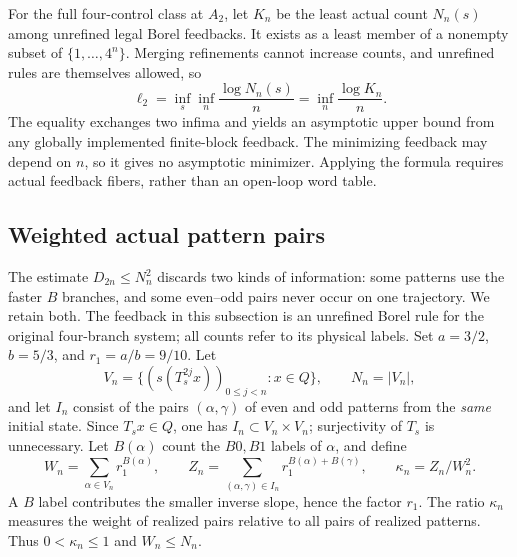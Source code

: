 \documentclass[11pt,reqno]{amsart}
\numberwithin{equation}{section}
\theoremstyle{definition}
\theoremstyle{definition}
\begin{document}
For the full four-control class at $A_2$, let $K_n$ be the least
actual count $N_n(s)$ among unrefined legal Borel feedbacks.
It exists as a least member of a nonempty subset of
$\{1,\ldots,4^n\}$. Merging refinements cannot increase counts,
and unrefined rules are themselves allowed, so
\begin{equation}\label{eq:finiteblock}
 \ell_2=\inf_s\inf_n\frac{\log N_n(s)}n
 =\inf_n\frac{\log K_n}n.
\end{equation}
The equality exchanges two infima and yields an asymptotic upper
bound from any globally implemented finite-block feedback. The
minimizing feedback may depend on $n$, so it gives no asymptotic
minimizer. Applying the formula requires actual feedback fibers,
rather than an open-loop word table.


\subsection{Weighted actual pattern pairs}
The estimate $D_{2n}\le N_n^2$ discards two kinds of information:
some patterns use the faster $B$ branches, and some even--odd pairs
never occur on one trajectory. We retain both. The feedback in this
subsection is an unrefined Borel rule for the original four-branch
system; all counts refer to its physical labels.
Set $a=3/2$, $b=5/3$, and $r_1=a/b=9/10$. Let
\[
 V_n=\{(s(T_s^{2j}x))_{0\le j<n}:x\in Q\},\qquad N_n=|V_n|,
\]
and let $I_n$ consist of the pairs $(\alpha,\gamma)$ of even
and odd patterns from the \emph{same} initial state. Since
$T_sx\in Q$, one has $I_n\subset V_n\times V_n$; surjectivity
of $T_s$ is unnecessary. Let $B(\alpha)$ count the $B0,B1$
labels of $\alpha$, and define
\[
 W_n=\sum_{\alpha\in V_n}r_1^{B(\alpha)},\qquad
 Z_n=\sum_{(\alpha,\gamma)\in I_n}
            r_1^{B(\alpha)+B(\gamma)},\qquad
 \kappa_n=Z_n/W_n^2.
\]
A $B$ label contributes the smaller inverse slope, hence the factor
$r_1$. The ratio $\kappa_n$ measures the weight of realized pairs
relative to all pairs of realized patterns. Thus
$0<\kappa_n\le1$ and $W_n\le N_n$.
\end{document}
